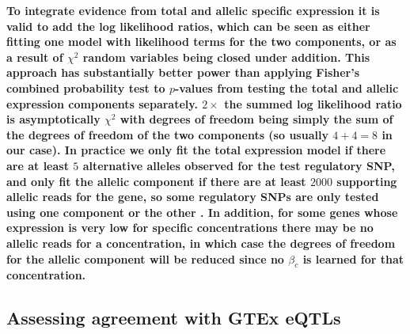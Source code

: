 \documentclass{article}
\newcommand{\tempbold}[1]{\textbf{#1}}
\begin{document}
\tempbold{To integrate evidence from total and allelic specific expression it is valid to add the log likelihood ratios, which can be seen as either fitting one model with likelihood terms for the two components, or as a result of $\chi^2$ random variables being closed under addition. This approach has substantially better power than applying Fisher's combined probability test to $p$-values from testing the total and allelic expression components separately.  $2\times$ the summed log likelihood ratio is asymptotically $\chi^2$  with degrees of freedom being simply the sum of the degrees of freedom of the two components (so usually $4+4=8$ in our case). In practice we only fit the total expression model if there are at least $5$ alternative alleles observed for the test regulatory SNP, and only fit the allelic component if there are at least $2000$ supporting allelic reads for the gene, so some regulatory SNPs are only tested using one component or the other . In addition, for some genes whose expression is very low for specific concentrations there may be no allelic reads for a concentration, in which case the degrees of freedom for the allelic component will be reduced since no $\beta_c$ is learned for that concentration.}

\subsection*{Assessing agreement with GTEx eQTLs}
\end{document}
